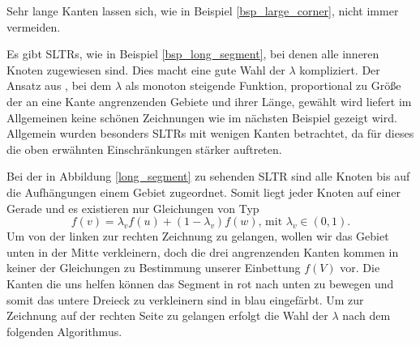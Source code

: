 Sehr lange Kanten lassen sich, wie in Beispiel \ref{bsp_large_corner}, nicht immer vermeiden. 

Es gibt SLTRs, wie in Beispiel \ref{bsp_long_segment}, bei denen alle inneren Knoten zugewiesen sind. Dies macht eine gute Wahl der $\lambda$ kompliziert. Der Ansatz aus \cite{fs17}, bei dem $\lambda$ als monoton steigende Funktion, proportional zu Größe der an eine Kante angrenzenden Gebiete und ihrer Länge, gewählt wird liefert im Allgemeinen keine schönen Zeichnungen wie im nächsten Beispiel gezeigt wird. Allgemein wurden besonders SLTRs mit wenigen Kanten betrachtet, da für dieses die oben erwähnten Einschränkungen stärker auftreten.

\begin{example}\label{bsp_long_segment}
Bei der in Abbildung \ref{long_segment} zu sehenden SLTR sind alle Knoten bis auf die Aufhängungen einem Gebiet zugeordnet. Somit liegt jeder Knoten auf einer Gerade und es existieren nur Gleichungen von Typ
$$ f(v) = \lambda_v f(u) + (1-\lambda_v)f(w) \text{, mit } \lambda_v \in (0,1).$$
Um von der linken zur rechten Zeichnung zu gelangen, wollen wir das Gebiet unten in der Mitte verkleinern, doch die drei angrenzenden Kanten kommen in keiner der Gleichungen zu Bestimmung unserer Einbettung $f(V)$ vor. Die Kanten die uns helfen können das Segment in rot nach unten zu bewegen und somit das untere Dreieck zu verkleinern sind in blau eingefärbt. Um zur Zeichnung auf der rechten Seite zu gelangen erfolgt die Wahl der $\lambda$ nach dem folgenden Algorithmus.

%

\end{example}

